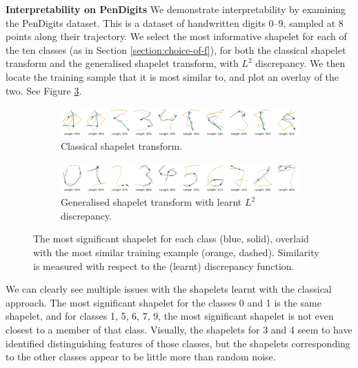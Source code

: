 \documentclass{article}
\theoremstyle{plain}
\theoremstyle{definition}
\newcommand{\boldheading}[1]{

\textbf{#1}\quad}
\begin{document}
\boldheading{Interpretability on PenDigits}
We demonstrate interpretability by examining the PenDigits dataset. This is a dataset of handwritten digits 0--9, sampled at 8 points along their trajectory. We select the most informative shapelet for each of the ten classes (as in Section \ref{section:choice-of-f}), for both the classical shapelet transform and the generalised shapelet transform, with $L^2$ discrepancy. We then locate the training sample that it is most similar to, and plot an overlay of the two. See Figure \ref{fig:pendigits}.

\begin{figure}[b]
\vspace{0.25em}
    \begin{subfigure}[b]{\linewidth}
        \centering
        \includegraphics[width=\linewidth]{images/old_pendigits.png}
        \caption{Classical shapelet transform.}
        \label{fig:old_shapelets}
    \end{subfigure}
    \begin{subfigure}[b]{\linewidth}
        \centering
        \includegraphics[width=\linewidth]{images/new_pendigits.png}
        \caption{Generalised shapelet transform with learnt $L^2$ discrepancy.}
        \label{fig:new_shapelets}
    \end{subfigure}
    \caption{The most significant shapelet for each class (blue, solid), overlaid with the most similar training example (orange, dashed). Similarity is measured with respect to the (learnt) discrepancy function.}
    \label{fig:pendigits}
\end{figure}

We can clearly see multiple issues with the shapelets learnt with the classical approach. The most significant shapelet for the classes 0 and 1 is the same shapelet, and for classes 1, 5, 6, 7, 9, the most significant shapelet is not even closest to a member of that class. Visually, the shapelets for 3 and 4 seem to have identified distinguishing features of those classes, but the shapelets corresponding to the other classes appear to be little more than random noise.
\end{document}
